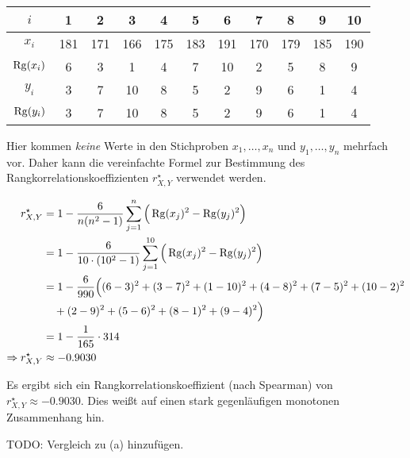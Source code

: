 \begin{table}[H]
\centering
\begin{tabular}{c|cccccccccc}
    $i$        & 1   & 2   & 3   & 4   & 5   & 6   & 7   & 8   & 9   & 10  \\ \hline\hline

    $x_i$      & 181 & 171 & 166 & 175 & 183 & 191 & 170 & 179 & 185 & 190 \\
    $\operatorname{Rg}(x_i)$ & 6   & 3   & 1   & 4   & 7   & 10  & 2   & 5   & 8   & 9   \\ \hline\hline

    $y_i$      & 3   & 7   & 10  & 8   & 5   & 2   & 9   & 6   & 1   & 4   \\
    $\operatorname{Rg}(y_i)$ & 3   & 7   & 10  & 8   & 5   & 2   & 9   & 6   & 1   & 4
\end{tabular}
\end{table}

Hier kommen \emph{keine} Werte in den Stichproben $x_1,\ldots,x_n$ und $y_1,\ldots,y_n$ mehrfach vor. Daher kann die vereinfachte Formel zur Bestimmung des Rangkorrelationskoeffizienten $r^\star_{X,Y}$ verwendet werden.

$$
\begin{aligned}
    r_{X,Y}^\star &= 1- \frac{6}{n(n^2-1)} \sum_{j=1}^{n} \Big(\operatorname{Rg}(x_j)^2 - \operatorname{Rg}(y_j)^2\Big) \\
    &= 1 - \frac{6}{10\cdot(10^2-1)} \sum_{j=1}^{10} \Big(\operatorname{Rg}(x_j)^2 - \operatorname{Rg}(y_j)^2\Big) \\
    &= 1 - \frac{6}{990} \Big( (6-3)^2 + (3-7)^2 + (1-10)^2 + (4-8)^2 + (7-5)^2 + (10-2)^2 \\
    &\quad + (2-9)^2 + (5-6)^2 + (8-1)^2 + (9-4)^2 \Big) \\
    &= 1 - \frac{1}{165}\cdot 314 \\
    \Rightarrow r_{X,Y}^\star &\approx -0.9030
\end{aligned}
$$

Es ergibt sich ein Rangkorrelationskoeffizient (nach Spearman) von $r_{X,Y}^\star \approx -0.9030$. Dies weißt auf einen stark gegenläufigen monotonen Zusammenhang hin.

{\color{red}
    TODO: Vergleich zu (a) hinzufügen.
}
